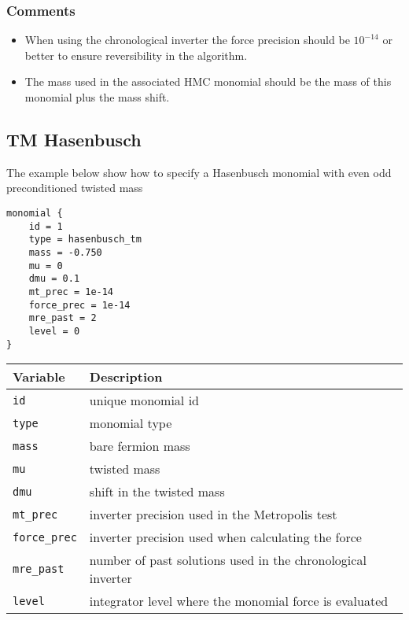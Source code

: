 \documentclass[12pt]{article}
\begin{document}
\subsubsection*{Comments}
\begin{itemize}
 \item When using the chronological inverter the force precision should be $10^{-14}$ or better to ensure reversibility in the algorithm.
 \item The mass used in the associated HMC monomial should be the mass of this monomial plus the mass shift.
\end{itemize}

\newpage
\subsection*{TM Hasenbusch}
The example below show how to specify a Hasenbusch monomial with even odd preconditioned twisted mass
\begin{center}
\begin{minipage}{60mm}
\begin{framed}
\begin{verbatim}
monomial {
    id = 1
    type = hasenbusch_tm
    mass = -0.750
    mu = 0
    dmu = 0.1
    mt_prec = 1e-14
    force_prec = 1e-14
    mre_past = 2
    level = 0
}

\end{verbatim}
\vspace{-5mm}
\end{framed}
\end{minipage}
\end{center}

\vspace{2mm}

\begin{center}
\begin{tabular}{l|l}
 Variable & Description \\
 \hline
 \verb|id|         & unique monomial id \\
 \verb|type|       & monomial type \\
 \verb|mass|       & bare fermion mass \\
 \verb|mu|         & twisted mass \\
 \verb|dmu|        & shift in the twisted mass \\
 \verb|mt_prec|    & inverter precision used in the Metropolis test \\
 \verb|force_prec| & inverter precision used when calculating the force \\
 \verb|mre_past|   & number of past solutions used in the chronological inverter \\
 \verb|level|      & integrator level where the monomial force is evaluated
\end{tabular}
\end{center}
\end{document}
